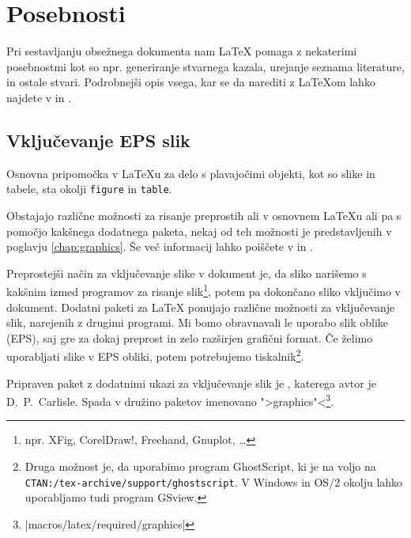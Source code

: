  
\chapter{Posebnosti}
\begin{intro}
  Pri sestavljanju obsežnega dokumenta nam \LaTeX{} pomaga z nekaterimi posebnostmi
  kot so npr. generiranje stvarnega kazala, urejanje seznama literature, in ostale
  stvari. Podrobnejši opis vsega, kar se da narediti z \LaTeX{}om lahko
  najdete v {\normalfont\manual{}} in {\normalfont \companion}.
\end{intro}

\section{Vključevanje EPS slik}\label{eps}
Osnovna pripomočka v \LaTeX{}u za delo s plavajočimi objekti, kot so
slike in tabele, sta okolji \texttt{figure} in \texttt{table}.

Obstajajo različne možnosti za risanje preprostih  ali v 
osnovnem \LaTeX{}u ali pa s pomočjo kakšnega dodatnega paketa, nekaj
od teh možnosti je predstavljenih v poglavju \ref{chap:graphics}.
Še več 
informacij lahko poiščete v \companion{} in \manual{}.

Preprostejši način za vključevanje slike v dokument je, da sliko narišemo s kakšnim izmed 
programov za risanje slik\footnote{npr. XFig, CorelDraw!, Freehand, Gnuplot, \ldots},
potem pa dokončano sliko vključimo v dokument. Dodatni paketi za \LaTeX{} ponujajo 
različne možnosti za vključevanje slik, narejenih z drugimi programi. Mi bomo obravnavali le 
uporabo slik oblike  (EPS), saj gre za dokaj preprost in zelo razširjen
grafični format. Če želimo uporabljati slike v EPS obliki, potem potrebujemo  tiskalnik\footnote{Druga 
  možnost je, da uporabimo program GhostScript,
  ki je na voljo na 
  \texttt{CTAN:/tex-archive/support/ghostscript}. V Windows in OS/2 okolju lahko 
  uporabljamo tudi program GSview.}.

Pripraven paket z dodatnimi ukazi za vključevanje slik je 
, katerega avtor je D.~P.~Carlisle. Spada v družino paketov imenovano 
">graphics"<\footnote{\CTANref|macros/latex/required/graphics|}.

